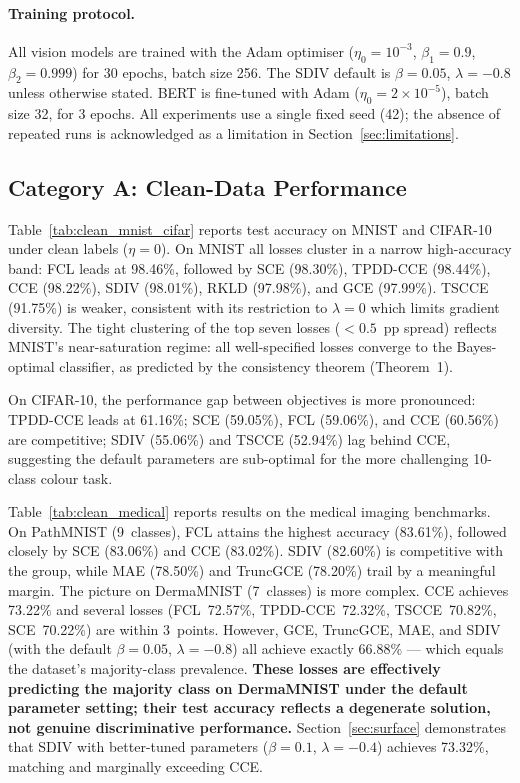 \paragraph{Training protocol.}
All vision models are trained with the Adam optimiser ($\eta_0{=}10^{-3}$,
$\beta_1{=}0.9$, $\beta_2{=}0.999$) for 30 epochs, batch size 256.
The SDIV default is $\beta{=}0.05$, $\lambda{=}{-0.8}$ unless otherwise
stated.
BERT is fine-tuned with Adam ($\eta_0{=}2{\times}10^{-5}$), batch size 32,
for 3 epochs.
All experiments use a single fixed seed (42); the absence of repeated runs
is acknowledged as a limitation in Section~\ref{sec:limitations}.

\subsection{Category A: Clean-Data Performance}
\label{sec:clean}

Table~\ref{tab:clean_mnist_cifar} reports test accuracy on MNIST and CIFAR-10
under clean labels ($\eta{=}0$).
On MNIST all losses cluster in a narrow high-accuracy band:
FCL leads at 98.46\%, followed by SCE (98.30\%), TPDD-CCE (98.44\%),
CCE (98.22\%), SDIV (98.01\%), RKLD (97.98\%), and GCE (97.99\%).
TSCCE (91.75\%) is weaker, consistent with its restriction to $\lambda{=}0$
which limits gradient diversity.
The tight clustering of the top seven losses ($<0.5$~pp spread) reflects
MNIST's near-saturation regime: all well-specified losses converge to the
Bayes-optimal classifier, as predicted by the consistency theorem
(Theorem~1).

On CIFAR-10, the performance gap between objectives is more pronounced:
TPDD-CCE leads at 61.16\%; SCE (59.05\%), FCL (59.06\%), and CCE (60.56\%)
are competitive; SDIV (55.06\%) and TSCCE (52.94\%) lag behind
CCE, suggesting the default parameters are sub-optimal for the more
challenging 10-class colour task.

Table~\ref{tab:clean_medical} reports results on the medical imaging benchmarks.
On PathMNIST (9~classes), FCL attains the highest accuracy (83.61\%),
followed closely by SCE (83.06\%) and CCE (83.02\%).
SDIV (82.60\%) is competitive with the group, while MAE (78.50\%) and
TruncGCE (78.20\%) trail by a meaningful margin.
The picture on DermaMNIST (7~classes) is more complex.
CCE achieves 73.22\% and several losses
(FCL~72.57\%, TPDD-CCE~72.32\%, TSCCE~70.82\%, SCE~70.22\%)
are within 3~points.
However, GCE, TruncGCE, MAE, and SDIV (with the default $\beta{=}0.05$,
$\lambda{=}{-0.8}$) all achieve exactly 66.88\% --- which equals the
dataset's majority-class prevalence.
\textbf{These losses are effectively predicting the majority class on
DermaMNIST under the default parameter setting; their test accuracy reflects
a degenerate solution, not genuine discriminative performance.}
Section~\ref{sec:surface} demonstrates that SDIV with better-tuned parameters
($\beta{=}0.1$, $\lambda{=}{-0.4}$) achieves 73.32\%, matching and
marginally exceeding CCE.

